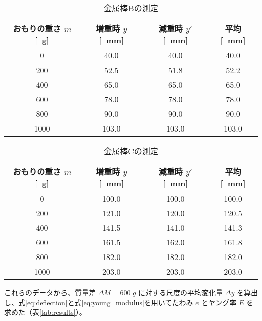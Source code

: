 \documentclass[a4paper,11pt,dvipdfmx]{jsarticle}
\begin{document}
\begin{table}[H]
    \centering
    \caption{金属棒Bの測定}
    \label{tab:data_B}
    \begin{tabular}{cccc}
        \hline
        おもりの重さ $m$ [\SI{}{g}] & 増重時 $y$ [\SI{}{mm}] & 減重時 $y'$ [\SI{}{mm}] & 平均 [\SI{}{mm}] \\
        \hline \hline
        0 & 40.0 & 40.0 & 40.0 \\
        200 & 52.5 & 51.8 & 52.2 \\
        400 & 65.0 & 65.0 & 65.0 \\
        600 & 78.0 & 78.0 & 78.0 \\
        800 & 90.0 & 90.0 & 90.0 \\
        1000 & 103.0 & 103.0 & 103.0 \\
        \hline
    \end{tabular}
\end{table}

\begin{table}[H]
    \centering
    \caption{金属棒Cの測定}
    \label{tab:data_C}
    \begin{tabular}{cccc}
        \hline
        おもりの重さ $m$ [\SI{}{g}] & 増重時 $y$ [\SI{}{mm}] & 減重時 $y'$ [\SI{}{mm}] & 平均 [\SI{}{mm}] \\
        \hline \hline
        0 & 100.0 & 100.0 & 100.0 \\
        200 & 121.0 & 120.0 & 120.5 \\
        400 & 141.5 & 141.0 & 141.3 \\
        600 & 161.5 & 162.0 & 161.8 \\
        800 & 182.0 & 182.0 & 182.0 \\
        1000 & 203.0 & 203.0 & 203.0 \\
        \hline
    \end{tabular}
\end{table}

これらのデータから、質量差 $\Delta M = \SI{600}{g}$ に対する尺度の平均変化量 $\Delta y$ を算出し、式\eqref{eq:deflection}と式\eqref{eq:young_modulus}を用いてたわみ $e$ とヤング率 $E$ を求めた（表\ref{tab:results}）。
\end{document}
